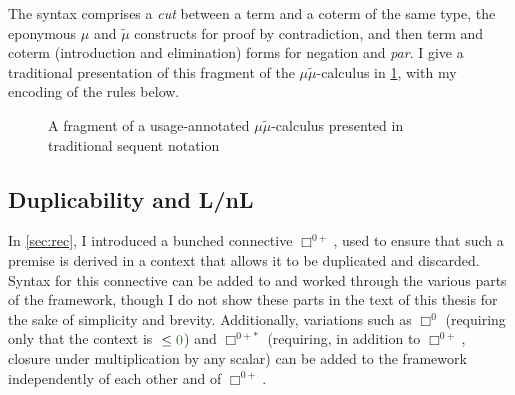 The syntax comprises a \emph{cut} between a term and a coterm of the same type,
the eponymous $\mu$ and $\tilde\mu$ constructs for proof by contradiction, and
then term and coterm (introduction and elimination) forms for negation and
\emph{par}.
I give a traditional presentation of this fragment of the
$\mu\tilde\mu$-calculus in \cref{fig:mmt-orig}, with my encoding of the rules
below.


\begin{figure}
  \caption{A fragment of a usage-annotated $\mu\tilde\mu$-calculus presented in
    traditional sequent notation}
  \label{fig:mmt-orig}
\end{figure}



\subsection{Duplicability and L/nL}\label{sec:dup-lnl}
In \cref{sec:rec}, I introduced a bunched connective $\Box^{0{+}}$, used to
ensure that such a premise is derived in a context that allows it to be
duplicated and discarded.
Syntax for this connective can be added to  and worked
through the various parts of the framework, though I do not show these parts in
the text of this thesis for the sake of simplicity and brevity.
Additionally, variations such as $\Box^0$ (requiring only that the context is
${} \leq \gr0$) and $\Box^{0{+}{*}}$ (requiring, in addition to
$\Box^{0{+}}$, closure under multiplication by any scalar) can be added to the
framework independently of each other and of $\Box^{0{+}}$.

